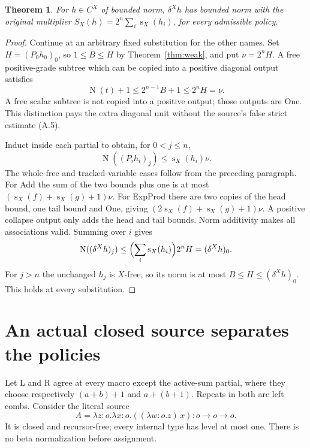 \documentclass[11pt]{article}
\newtheorem{theorem}{Theorem}[section]
\newcommand{\norm}{\operatorname{N}}
\newcommand{\sz}{\operatorname{s}}
\begin{document}
\begin{theorem}\label{thm:norm}
For $h\in C^X$ of bounded norm, $\delta^X h$ has bounded norm with the original
multiplier $S_X(h)=2^n\sum_i\sz_X(h_i)$, for every admissible policy.
\end{theorem}
\begin{proof}
Continue at an arbitrary fixed substitution for the other names. Set
$H=(P_0h_0)_0$, so $1\le B\le H$ by Theorem~\ref{thm:weak}, and
put $\nu=2^nH$. A free positive-grade subtree which can be copied into
a positive diagonal output satisfies
\[
 \norm(t)+1\le2^{n-1}B+1\le2^nH=\nu.
\]
A free scalar subtree is not copied into a positive output; those
outputs are One. This distinction pays the extra diagonal unit without
the source's false strict estimate (A.5).

Induct inside each partial to obtain, for $0<j\le n$,
\[
 \norm((P_i h_i)_j)\le\sz_X(h_i)\nu.
\]
The whole-free and tracked-variable cases follow from the preceding
paragraph. For Add the sum of the two bounds plus one is at most
$(\sz_X(f)+\sz_X(g)+1)\nu$. For ExpProd there are two copies of the
head bound, one tail bound and One, giving
$(2\sz_X(f)+\sz_X(g)+1)\nu$. A positive collapse output only adds
the head and tail bounds. Norm additivity makes all associations valid.
Summing over $i$ gives
\[
 \norm((\delta^Xh)_j)\le\Bigl(\sum_i\sz_X(h_i)\Bigr)2^nH
                      =(\delta^Xh)_0.
\]
For $j>n$ the unchanged $h_j$ is $X$-free, so its norm is at most
$B\le H\le(\delta^Xh)_0$. This holds at every substitution.
\end{proof}

\section{An actual closed source separates the policies}\label{sec:witness}

Let L and R agree at every macro except the active-sum partial, where
they choose respectively $(a+b)+1$ and $a+(b+1)$. Repeats in both
are left combs. Consider the literal source
\[
 A=\lambda z:o.\lambda x:o.((\lambda w:o.z)\,x)
                  :o\to o\to o.
\]
It is closed and recursor-free; every internal type has level at most
one. There is no beta normalization before assignment.
\end{document}
